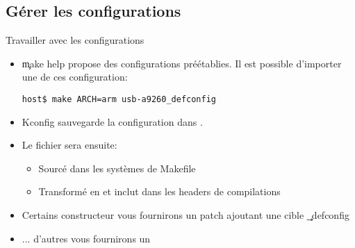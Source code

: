 \subsection{Gérer les configurations}

\begin{frame}[fragile=singleslide]{Travailler avec les configurations}
  \begin{itemize} 
  \item \c{make  help} propose des configurations  préétablies. Il est
    possible d'importer une de ces configuration:
    \begin{lstlisting} 
host$ make ARCH=arm usb-a9260_defconfig
    \end{lstlisting} 
  \item Kconfig sauvegarde la configuration dans . 
  \item Le fichier  sera ensuite:
    \begin{itemize} 
    \item Sourcé dans les systèmes de Makefile
    \item Transformé  en  et inclut
      dans les headers de compilations
    \end{itemize} 
  \item Certains  constructeur vous  fournirons un patch  ajoutant une
    cible \c{_defconfig}
  \item ... d'autres vous fournirons un 
\end{itemize} 
\end{frame} 

